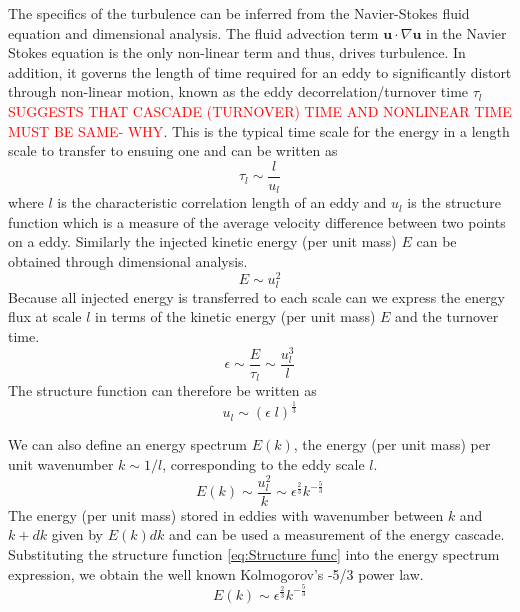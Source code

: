 The specifics of the turbulence can be inferred from the Navier-Stokes fluid equation and dimensional analysis. The fluid advection term \(\boldsymbol{u}\cdot \nabla\boldsymbol{u}\) in the Navier Stokes equation is the only non-linear term and thus, drives turbulence. In addition, it governs the length of time required for an eddy to significantly distort through non-linear motion, known as the eddy decorrelation/turnover time \(\tau_l\) \textcolor{red}{SUGGESTS THAT CASCADE (TURNOVER) TIME AND NONLINEAR TIME MUST BE SAME- WHY}. This is the typical time scale for the energy in a length scale to transfer to ensuing one and can be written as 
\begin{equation*}
    \tau_l \sim \frac{l}{u_l} 
\end{equation*}
where \(l\) is the characteristic correlation length of an eddy and \(u_l\) is the structure function which is a measure of the average velocity difference between two points on a eddy. Similarly the injected kinetic energy (per unit mass) \(E\) can be obtained through dimensional analysis.
\begin{equation*}
   E \sim u_l^2 
\end{equation*}
Because all injected energy is transferred to each scale can we express the energy flux at scale \(l\) in terms of the kinetic energy  (per unit mass) \(E\) and the turnover time.
\begin{equation*}
    \epsilon \sim \frac{E}{\tau_l} \sim \frac{u_l^3}{l} 
\end{equation*}
The structure function can therefore be written as 
\begin{equation}
    u_l \sim (\epsilon \; l)^{\frac{1}{3}} 
    \label{eq:Structure func}
\end{equation}

We can also define an energy spectrum \(E(k)\), the energy  (per unit mass) per unit wavenumber \(k \sim 1/l\), corresponding to the eddy scale \(l\).
\begin{equation*}
   E(k) \sim \frac{u_l^2}{k} \sim \epsilon^\frac{2}{3}k^{-\frac{5}{3}}
\end{equation*}
The energy (per unit mass) stored in eddies with wavenumber between \(k\) and \(k+dk\) given by \(E(k)dk\) and can be used a measurement of the energy cascade. Substituting the structure function \eqref{eq:Structure func} into the energy spectrum expression, we obtain the well known Kolmogorov's -5/3 power law. 
\begin{equation}
   E(k) \sim \epsilon^\frac{2}{3}k^{-\frac{5}{3}}
   \label{eq:Kolmogorov law}
\end{equation}
